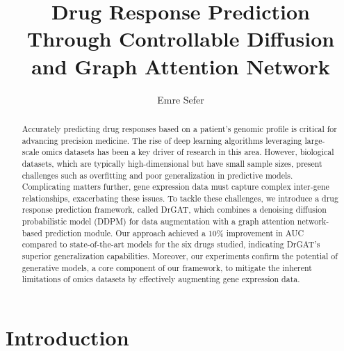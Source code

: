 \documentclass[runningheads]{llncs}
\newcommand{\drdiff}{DrGAT\xspace}
\begin{document}
%
\title{Drug Response Prediction Through Controllable Diffusion and Graph Attention Network}
%
%
\author{Emre Sefer}
%
%
%
\maketitle              %
%
\begin{abstract}

Accurately predicting drug responses based on a patient's genomic
profile is critical for advancing precision medicine. The rise of deep
learning algorithms leveraging large-scale omics datasets has been a key driver of research in this area. However, biological datasets,
which are typically high-dimensional but have small sample sizes,
present challenges such as overfitting and poor generalization in
predictive models. Complicating matters further, gene expression data must capture complex inter-gene relationships, exacerbating these issues. To tackle these challenges, we introduce a drug response
prediction framework, called \drdiff, which combines a denoising diffusion probabilistic model (DDPM) for data augmentation with a graph attention network-based prediction module. Our approach achieved a $10\%$ improvement in AUC compared to state-of-the-art models for the six drugs studied, indicating \drdiff's superior generalization capabilities. Moreover, our experiments confirm the potential of generative models, a core component of our framework, to mitigate the inherent limitations of omics datasets by effectively augmenting gene expression data.


\end{abstract}
%
%
%

\section{Introduction}
\end{document}
